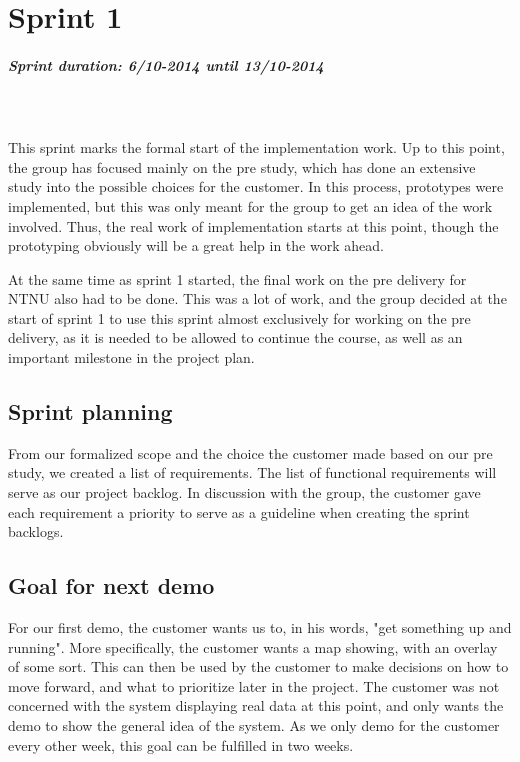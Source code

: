\documentclass[11pt,a4paper,titlepage,oneside]{report}
\begin{document}
\chapter{Sprint 1}
\paragraph{Sprint duration: 6/10-2014 until 13/10-2014} \hfill \\
\\
\noindent
This sprint marks the formal start of the implementation work. Up to this point, the group has focused mainly on the pre study, which has done an extensive study into the possible choices for the customer. In this process, prototypes were implemented, but this was only meant for the group to get an idea of the work involved. Thus, the real work of implementation starts at this point, though the prototyping obviously will be a great help in the work ahead. 

At the same time as sprint 1 started, the final work on the pre delivery for \gls{NTNU} also had to be done. This was a lot of work, and the group decided at the start of sprint 1 to use this sprint almost exclusively for working on the pre delivery, as it is needed to be allowed to continue the course, as well as an important milestone in the project plan. 

\section{Sprint planning}
From our formalized scope and the choice the customer made based on our pre study, we created a list of requirements. The list of functional requirements will serve as our project backlog. In discussion with the group, the customer gave each requirement a priority to serve as a guideline when creating the sprint backlogs.

\section{Goal for next demo}
For our first demo, the customer wants us to, in his words, "get something up and running". More specifically, the customer wants a map showing, with an overlay of some sort. This can then be used by the customer to make decisions on how to move forward, and what to prioritize later in the project. The customer was not concerned with the system displaying real data at this point, and only wants the demo to show the general idea of the system. As we only demo for the customer every other week, this goal can be fulfilled in two weeks.
\end{document}
